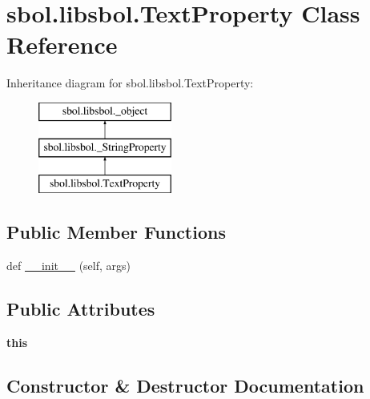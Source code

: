 \hypertarget{classsbol_1_1libsbol_1_1_text_property}{}\section{sbol.\+libsbol.\+Text\+Property Class Reference}
\label{classsbol_1_1libsbol_1_1_text_property}
Inheritance diagram for sbol.\+libsbol.\+Text\+Property\+:\begin{figure}[H]
\begin{center}
\leavevmode
\includegraphics[height=3.000000cm]{classsbol_1_1libsbol_1_1_text_property}
\end{center}
\end{figure}
\subsection*{Public Member Functions}
\begin{DoxyCompactItemize}
\item 
def \hyperlink{classsbol_1_1libsbol_1_1_text_property_a60cd97c92f9cd9caad38e2e68cd2c891}{\+\_\+\+\_\+init\+\_\+\+\_\+} (self, args)
\end{DoxyCompactItemize}
\subsection*{Public Attributes}
\begin{DoxyCompactItemize}
\item 
{\bfseries this}\hypertarget{classsbol_1_1libsbol_1_1_text_property_a9edadf97a0634a32aa971388837f379e}{}\label{classsbol_1_1libsbol_1_1_text_property_a9edadf97a0634a32aa971388837f379e}

\end{DoxyCompactItemize}


\subsection{Constructor \& Destructor Documentation}
